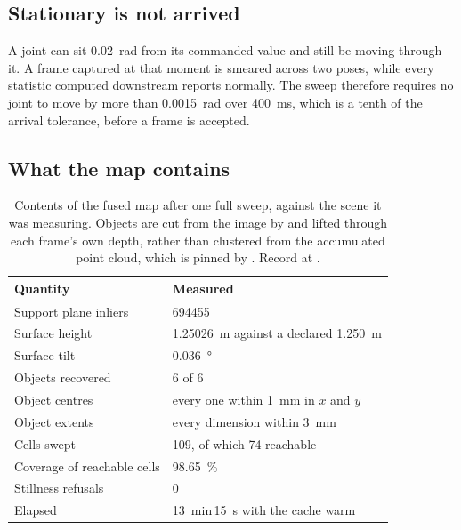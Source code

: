 \subsection{Stationary is not arrived}

A joint can sit \SI{0.02}{\radian} from its commanded value and still be
moving through it. A frame captured at that moment is smeared across two
poses, while every statistic computed downstream reports normally. The sweep
therefore requires no joint to move by more than \SI{0.0015}{\radian} over
\SI{400}{\milli\second}, which is a tenth of the arrival tolerance, before a
frame is accepted.

\subsection{What the map contains}

\begin{table}[htbp]
  \centering
  \caption[Measured map accuracy]{Contents of the fused map after one full
  sweep, against the scene it was measuring. Objects are cut from the image by
   and lifted through each frame's own depth, rather than
  clustered from the accumulated point cloud, which is pinned by
  . Record at
  .}
  \label{tab:map}
  \begin{tabular}{@{}ll@{}}
    \toprule
    Quantity & Measured \\
    \midrule
    Support plane inliers & \num{694455} \\
    Surface height & \SI{1.25026}{\metre} against a declared \SI{1.250}{\metre} \\
    Surface tilt & \SI{0.036}{\degree} \\
    Objects recovered & 6 of 6 \\
    Object centres & every one within \SI{1}{\milli\metre} in $x$ and $y$ \\
    Object extents & every dimension within \SI{3}{\milli\metre} \\
    Cells swept & 109, of which 74 reachable \\
    Coverage of reachable cells & \SI{98.65}{\percent} \\
    Stillness refusals & 0 \\
    Elapsed & \SI{13}{\minute}\,\SI{15}{\second} with the cache warm \\
    \bottomrule
  \end{tabular}
\end{table}

